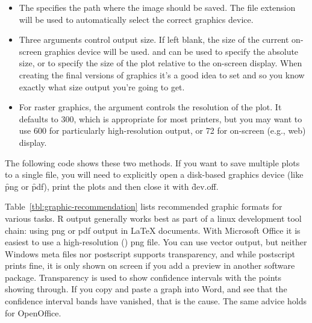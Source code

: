 \begin{itemize}
  \item The  specifies the path where the image should be saved.  The file extension will be used to automatically select the correct graphics device.
  
  \item Three arguments control output size.  If left blank, the size of the current on-screen graphics device will be used.   and  can be used to specify the absolute size, or  to specify the size of the plot relative to the on-screen display.  When creating the final versions of graphics it's a good idea to set  and  so you know exactly what size output you're going to get.

  \item For raster graphics, the  argument controls the resolution of the plot. It defaults to 300, which is appropriate for most printers, but you may want to use 600 for particularly high-resolution output, or 72 for on-screen (e.g., web) display.
  
\end{itemize}

The following code shows these two methods. If you want to save multiple plots to a single file, you will need to explicitly open a disk-based graphics device (like \f{png} or \f{pdf}), print the plots and then close it with \f{dev.off}.

% 
% 


Table~\ref{tbl:graphic-recommendation} lists recommended graphic formats for various tasks.  R output generally works best as part of a linux development tool chain: using png or pdf output in \LaTeX{} documents.  With Microsoft Office it is easiest to use a high-resolution () png file.  You can use vector output, but neither Windows meta files nor postscript supports transparency, and while postscript prints fine, it is only shown on screen if you add a preview in another software package. Transparency is used to show confidence intervals with the points showing through. If you copy and paste a graph into Word, and see that the confidence interval bands have vanished, that is the cause. The same advice holds for OpenOffice.

